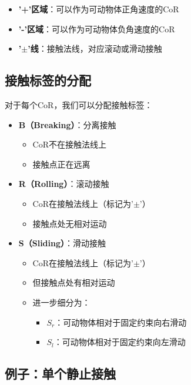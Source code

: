 \documentclass[12pt,a4paper]{article}
\begin{document}
\begin{itemize}
\item \textbf{'+'区域}：可以作为可动物体正角速度的CoR
\item \textbf{'-'区域}：可以作为可动物体负角速度的CoR
\item \textbf{'$\pm$'线}：接触法线，对应滚动或滑动接触
\end{itemize}

\subsection{接触标签的分配}

对于每个CoR，我们可以分配接触标签：

\begin{itemize}
\item \textbf{B（Breaking）}：分离接触
  \begin{itemize}
  \item CoR不在接触法线上
  \item 接触点正在远离
  \end{itemize}

\item \textbf{R（Rolling）}：滚动接触
  \begin{itemize}
  \item CoR在接触法线上（标记为'$\pm$'）
  \item 接触点处无相对运动
  \end{itemize}

\item \textbf{S（Sliding）}：滑动接触
  \begin{itemize}
  \item CoR在接触法线上（标记为'$\pm$'）
  \item 但接触点处有相对运动
  \item 进一步细分为：
    \begin{itemize}
    \item \textbf{$S_r$}：可动物体相对于固定约束向右滑动
    \item \textbf{$S_l$}：可动物体相对于固定约束向左滑动
    \end{itemize}
  \end{itemize}
\end{itemize}

\subsection{例子：单个静止接触}
\end{document}
